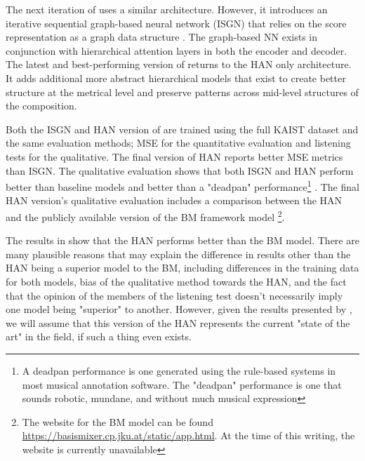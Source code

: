 The next iteration of \vnet{} uses a similar \ed{} architecture. However, it introduces an iterative sequential graph-based neural network (ISGN) that relies on the score representation as a graph data structure \cite{jeong2019graph}. The graph-based NN exists in conjunction with hierarchical attention layers in both the encoder and decoder. The latest and best-performing version of \vnet{}\cite{jeong2019virtuosonet} returns to the HAN only architecture. It adds additional more abstract hierarchical models that exist to create better structure at the metrical level and preserve patterns across mid-level structures of the composition. 

Both the ISGN\cite{jeong2019graph} and HAN\cite{jeong2019virtuosonet} version of \vnet{} are trained using the full KAIST dataset and the same evaluation methods; MSE for the quantitative evaluation and listening tests for the qualitative. The final version of HAN reports better MSE metrics than ISGN. The qualitative evaluation shows that both ISGN and HAN perform better than baseline models and better than a "deadpan" performance\footnote{A deadpan performance is one generated using the rule-based systems in most musical annotation software. The "deadpan" performance is one that sounds robotic, mundane, and without much musical expression} . The final HAN version's qualitative evaluation includes a comparison between the HAN and the publicly available version of the BM framework model \footnote{The website for the BM model can be found \href{here}{https://basismixer.cp.jku.at/static/app.html}. At the time of this writing, the website is currently unavailable}. 

The results in \cite{jeong2019virtuosonet} show that the HAN performs better than the BM model. There are many plausible reasons that may explain the difference in results other than the HAN being a superior model to the BM, including differences in the training data for both models, bias of the qualitative method towards the HAN, and the fact that the opinion of the members of the listening test doesn't necessarily imply one model being "superior" to another. However, given the results presented by \citet{jeong2019virtuosonet}, we will assume that this version of the HAN represents the current "state of the art" in the field, if such a thing even exists. 


